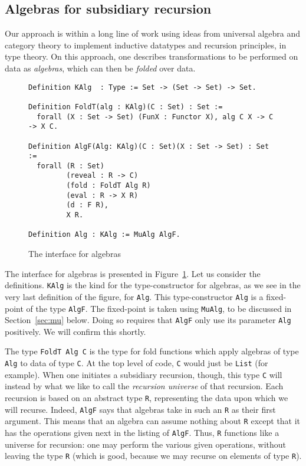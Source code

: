 \documentclass[a4paper,USenglish]{lipics-v2021}
\begin{document}
\subsection{Algebras for subsidiary recursion}

Our approach is within a long line of work using ideas from
universal algebra and category theory to implement inductive datatypes
and recursion principles, in type theory.  On this approach, one describes
transformations to be performed on data as \emph{algebras}, which can then
be \textit{folded} over data.  

\begin{figure}
\begin{verbatim}
Definition KAlg  : Type := Set -> (Set -> Set) -> Set.

Definition FoldT(alg : KAlg)(C : Set) : Set :=
  forall (X : Set -> Set) (FunX : Functor X), alg C X -> C -> X C.

Definition AlgF(Alg: KAlg)(C : Set)(X : Set -> Set) : Set :=
  forall (R : Set)
         (reveal : R -> C)        
         (fold : FoldT Alg R)
         (eval : R -> X R)      
         (d : F R),             
         X R.

Definition Alg : KAlg := MuAlg AlgF.
\end{verbatim}
\caption{The interface for algebras}
\label{fig:algf}
\end{figure}

The interface for algebras is presented in Figure~\ref{fig:algf}.
Let us consider the definitions.  \verb|KAlg| is the kind for the type-constructor for algebras,
as we see in the very last definition of the figure, for \verb|Alg|.  This type-constructor \verb|Alg|
is a fixed-point of the type \verb|AlgF|.  The fixed-point is taken using \verb|MuAlg|,
to be discussed in Section~\ref{sec:mu} below.  Doing so requires that \verb|AlgF| only use its parameter
\verb|Alg| positively.  We will confirm this shortly.

The type \verb|FoldT Alg C| is the type for fold functions which apply
algebras of type \verb|Alg| to data of type \verb|C|.  At the top
level of code, \verb|C| would just be \verb|List| (for example).  When
one initiates a subsidiary recursion, though, this type \verb|C| will
instead by what we like to call the \emph{recursion universe} of that
recursion.  Each recursion is based on an abstract type \verb|R|,
representing the data upon which we will recurse.  Indeed, \verb|AlgF|
says that algebras take in such an \verb|R| as their first argument.
This means that an algebra can assume nothing about \verb|R| except
that it has the operations given next in the listing of \verb|AlgF|.
Thus, \verb|R| functions like a universe for recursion: one may
perform the various given operations, without leaving the type
\verb|R| (which is good, because we may recurse on elements of type \verb|R|).
\end{document}
